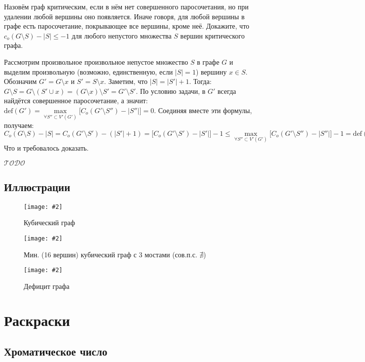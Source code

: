 \documentclass[a4paper,12pt]{article}
\numberwithin{figure}{section}
\def\TODO{\guillemotleft$\mathcal{TODO}$\guillemotright\textellipsis}
\newcommand\CenterFigureCaption[3]{
	\begin{figure}[H]
		\centering
		\texttt{[image: \#2]}
		\caption{#3}
	\end{figure}
}
\begin{document}
\begin{problem}
  Назовём граф критическим, если в нём нет совершенного паросочетания, но при удалении любой вершины оно появляется. Иначе говоря, для любой вершины в графе есть паросочетание,	покрывающее все вершины, кроме неё. Докажите, что $c_o(G \setminus S) - |S| \leqslant -1$ для любого непустого множества $S$ вершин критического графа.
\end{problem}
\begin{solution}
  Рассмотрим произвольное произвольное непустое множество $S$ в графе $G$
  и выделим произвольную (возможно, единственную, если $|S|=1$) вершину $x \in S$.
  Обозначим $G' = G \setminus x$ и $S' = S \setminus x$.
  Заметим, что $ |S| = |S'| + 1 $.
  Тогда:
  $ G \setminus S = G \setminus (S' \cup x) = (G \setminus x) \setminus S' = G' \setminus S' $.
  По условию задачи, в $G'$ всегда найдётся совершенное паросочетание, а значит:
  $ \mathrm{def}(G') = \max \limits_{\forall S'' \subset V'(G')} \big[ C_o(G' \setminus S'') - |S''| \big] = 0 $.
  Соединяя вместе эти формулы, получаем:
  $C_o(G \setminus S) - |S| = C_o(G' \setminus S') - (|S'| + 1) = \big[ C_o(G' \setminus S') - |S'| \big] - 1 \leqslant
   \max \limits_{\forall S'' \subset V'(G')} \big[ C_o(G' \setminus S'') - |S''| \big] - 1
   = \mathrm{def}(G') - 1 = 0 - 1 = -1 $
  Что и требовалось доказать. 
\end{solution}

\TODO


\subsection{Иллюстрации}

\CenterFigureCaption{7cm}{cubic-graph-example1.png}{Кубический граф}

\CenterFigureCaption{9cm}{minimum-cubic-graph-with3-bridges.png}{Мин. (16 вершин) кубический граф с 3 мостами (сов.п.с. $\nexists$)}

\CenterFigureCaption{10cm}{matching-deficit-2.png}{Дефицит графа}



\section{Раскраски}


\subsection{Хроматическое число}
\end{document}
